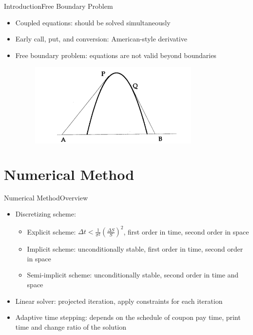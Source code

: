 \documentclass{beamer}
\begin{document}
\begin{frame} {Introduction}{Free Boundary Problem}
	\begin{itemize}
		\item Coupled equations: should be solved simultaneously
		\item Early call, put, and conversion: American-style derivative
		\item Free boundary problem: equations are not valid beyond boundaries
		\begin{figure}
		\centering
		\includegraphics[width=0.8\textwidth]{Figures/obstacle.png}
		\end{figure}
	\end{itemize}
\end{frame}
\section{Numerical Method}

\begin{frame}{Numerical Method}{Overview}
	\begin{itemize}
		\item Discretizing scheme:
			\begin{itemize}
				\item Explicit scheme: $\Delta t < \frac{1}{\sigma^2}(\frac{\Delta S}{S})^2$, first order in time, second order in space
				\item Implicit scheme: unconditionally stable, first order in time, second order in space
				\item Semi-implicit scheme: unconditionally stable, second order in time and space
			\end{itemize}
		\item Linear solver: projected iteration, apply constraints for each iteration
		\item Adaptive time stepping: depends on the schedule of coupon pay time, print time and change ratio of the solution
	\end{itemize}
\end{frame}
\end{document}

